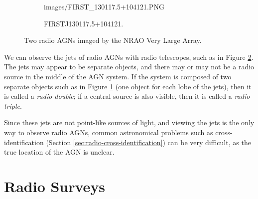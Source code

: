 \begin{figure}
\begin{subfigure}{0.4\textwidth}
                    {images/FIRST_130117.5+104121.PNG}
                \caption{FIRSTJ130117.5+104121.}
                \label{fig:first-double}
            \end{subfigure}%
            \caption{Two radio AGNs imaged by the NRAO Very Large Array.}
            \label{fig:first-agn}
        \end{figure}

        We can observe the jets of radio AGNs with radio telescopes, such as in
        Figure \ref{fig:first-agn}. The jets may appear to be separate objects,
        and there may or may not be a radio source in the middle of the AGN
        system. If the system is composed of two separate objects such as in
        Figure \ref{fig:first-double} (one object for each lobe of the jets),
        then it is called a \emph{radio double}; if a central source is also
        visible, then it is called a \emph{radio triple}.

        Since these jets are not point-like sources
        of light, and viewing the jets is the only way to observe radio AGNs,
        common astronomical problems such as cross-identification (Section
        \ref{sec:radio-cross-identification}) can be very difficult, as the true
        location of the AGN is unclear.



    \section{Radio Surveys}
    \label{sec:radio-surveys}

